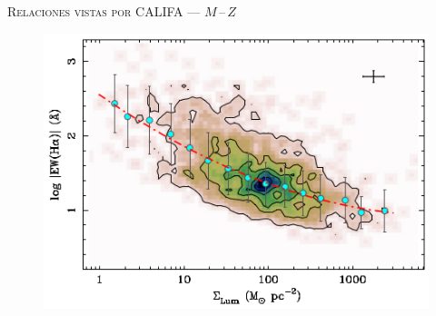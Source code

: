 \documentclass[xcolor=dvipsnames,4pt,hyperref={colorlinks,citecolor=black,linkcolor=black,urlcolor=black}]{beamer}
\begin{document}
\begin{frame}{\textsc{Relaciones vistas por CALIFA --- $M\,$--$\,Z$}}

\begin{figure}
\includegraphics[scale=1]{img/rosales-ortega2012-3}
\end{figure}
\end{frame}
\end{document}
